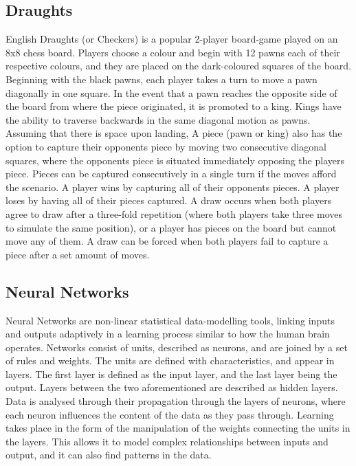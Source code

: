 \documentclass[12pt,a4paper]{article}
\begin{document}
    \subsection*{Draughts}

    English Draughts (or Checkers) is a popular 2-player board-game played on an 8x8 chess board. Players choose a colour and begin with 12 pawns each of their respective colours, and they are placed on the dark-coloured squares of the board. Beginning with the black pawns, each player takes a turn to move a pawn diagonally in one square. In the event that a pawn reaches the opposite side of the board from where the piece originated, it is promoted to a king. Kings have the ability to traverse backwards in the same diagonal motion as pawns. Assuming that there is space upon landing, A piece (pawn or king) also has the option to capture their opponents piece by moving two consecutive diagonal squares, where the opponents piece is situated immediately opposing the players piece. Pieces can be captured consecutively in a single turn if the moves afford the scenario. A player wins by capturing all of their opponents pieces. A player loses by having all of their pieces captured. A draw occurs when both players agree to draw after a three-fold repetition (where both players take three moves to simulate the same position), or a player has pieces on the board but cannot move any of them. A draw can be forced when both players fail to capture a piece after a set amount of moves.

    \subsection*{Neural Networks}

    Neural Networks are non-linear statistical data-modelling tools, linking inputs and outputs adaptively in a learning process similar to how the human brain operates. Networks consist of units, described as neurons, and are joined by a set of rules and weights. The units are defined with characteristics, and appear in layers. The first layer is defined as the input layer, and the last layer being the output. Layers between the two aforementioned are described as hidden layers. Data is analysed through their propagation through the layers of neurons, where each neuron influences the content of the data as they pass through. Learning takes place in the form of the manipulation of the weights connecting the units in the layers. This allows it to model complex relationships between inputs and output, and it can also find patterns in the data. 
\end{document}
